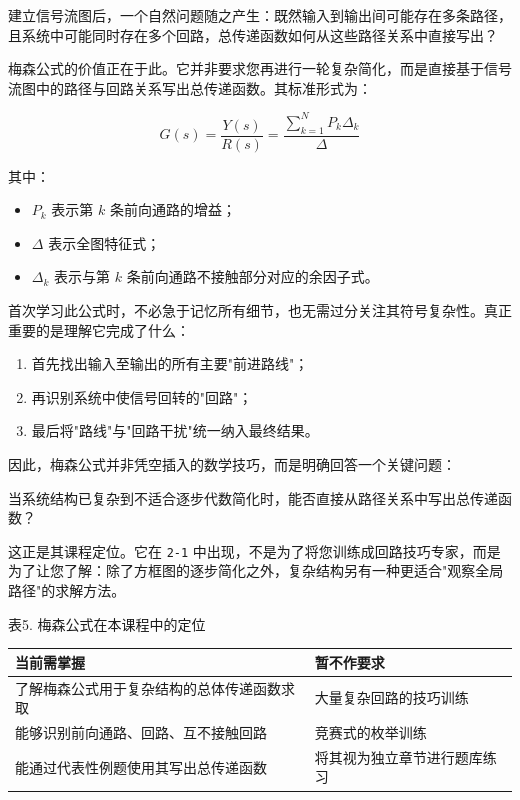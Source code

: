 \documentclass[
  11pt]{article}
\providecommand{\tightlist}{%
  \setlength{\itemsep}{0pt}\setlength{\parskip}{0pt}}
\renewenvironment{quote}
  {\begin{HandoutQuoteBox}\small\color{TitleBlue}\noindent\ignorespaces}
  {\end{HandoutQuoteBox}}
\begin{document}
建立信号流图后，一个自然问题随之产生：既然输入到输出间可能存在多条路径，且系统中可能同时存在多个回路，总传递函数如何从这些路径关系中直接写出？

梅森公式的价值正在于此。它并非要求您再进行一轮复杂简化，而是直接基于信号流图中的路径与回路关系写出总传递函数。其标准形式为：

\[
G(s)=\frac{Y(s)}{R(s)}=\frac{\sum_{k=1}^{N} P_k \Delta_k}{\Delta}
\]

其中：

\begin{itemize}
\tightlist
\item
  \(P_k\) 表示第 \(k\) 条前向通路的增益；
\item
  \(\Delta\) 表示全图特征式；
\item
  \(\Delta_k\) 表示与第 \(k\) 条前向通路不接触部分对应的余因子式。
\end{itemize}

首次学习此公式时，不必急于记忆所有细节，也无需过分关注其符号复杂性。真正重要的是理解它完成了什么：

\begin{enumerate}
\def\labelenumi{\arabic{enumi}.}
\tightlist
\item
  首先找出输入至输出的所有主要"前进路线"；
\item
  再识别系统中使信号回转的"回路"；
\item
  最后将"路线"与"回路干扰"统一纳入最终结果。
\end{enumerate}

因此，梅森公式并非凭空插入的数学技巧，而是明确回答一个关键问题：

\begin{quote}
当系统结构已复杂到不适合逐步代数简化时，能否直接从路径关系中写出总传递函数？
\end{quote}

这正是其课程定位。它在 \texttt{2-1}
中出现，不是为了将您训练成回路技巧专家，而是为了让您了解：除了方框图的逐步简化之外，复杂结构另有一种更适合"观察全局路径"的求解方法。

表5. 梅森公式在本课程中的定位

\begin{longtable}[]{@{}ll@{}}
\toprule\noalign{}
当前需掌握 & 暂不作要求 \\
\midrule\noalign{}
\endhead
\bottomrule\noalign{}
\endlastfoot
了解梅森公式用于复杂结构的总体传递函数求取 & 大量复杂回路的技巧训练 \\
能够识别前向通路、回路、互不接触回路 & 竞赛式的枚举训练 \\
能通过代表性例题使用其写出总传递函数 & 将其视为独立章节进行题库练习 \\
\end{longtable}
\end{document}
